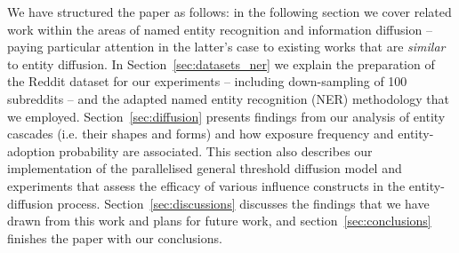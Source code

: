 \documentclass[sigconf]{acmart}
\begin{document}
We have structured the paper as follows: in the following section we cover related work within the areas of named entity recognition and information diffusion -- paying particular attention in the latter's case to existing works that are \emph{similar} to entity diffusion.
In Section~\ref{sec:datasets_ner} we explain the preparation of the Reddit dataset for our experiments -- including down-sampling of 100 subreddits -- and the adapted named entity recognition (NER) methodology that we employed.
Section~\ref{sec:diffusion} presents findings from our analysis of entity cascades (i.e. their shapes and forms) and how exposure frequency and entity-adoption probability are associated.
This section also describes our implementation of the parallelised general threshold diffusion model and experiments that assess the efficacy of various influence constructs in the entity-diffusion process.
Section~\ref{sec:discussions} discusses the findings that we have drawn from this work and plans for future work, and section~\ref{sec:conclusions} finishes the paper with our conclusions.


%
%
%
%
\end{document}
